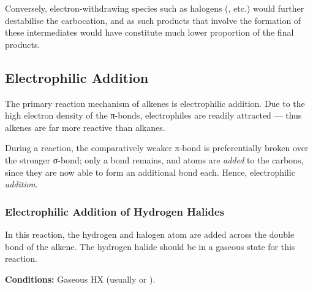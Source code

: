 		Conversely, electron-withdrawing species such as halogens (,  etc.) would further destabilise
		the carbocation, and as such products that involve the formation of these intermediates would have constitute much
		lower proportion of the final products.



\subsection{Electrophilic Addition}

	The primary reaction mechanism of alkenes is electrophilic addition. Due to the high electron density of the π-bonds,
	electrophiles are readily attracted –– thus alkenes are far more reactive than alkanes.

	During a reaction, the comparatively weaker π-bond is preferentially broken over the stronger σ-bond; only a
	 bond remains, and atoms are \textit{added} to the carbons, since they are now able to form an additional
	bond each. Hence, electrophilic \textit{addition}.



	\subsubsection{Electrophilic Addition of Hydrogen Halides}

		In this reaction, the hydrogen and halogen atom are added across the double bond of the alkene. The hydrogen halide
		should be in a gaseous state for this reaction.

		\textbf{Conditions:} Gaseous HX (usually  or ).
		\vspace{1.0em}




